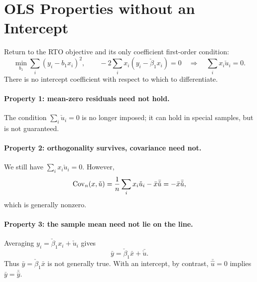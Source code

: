 \section{OLS Properties without an Intercept}
\label{sec:rto-properties}
Return to the RTO objective and its only coefficient first-order condition:
\[\min_{b_1}\sum_i(y_i-b_1x_i)^2,\qquad
-2\sum_i x_i(y_i-\check\beta_1x_i)=0
\quad\Longrightarrow\quad\sum_i x_i\check u_i=0.\]
There is no intercept coefficient with respect to which to differentiate.

\paragraph{Property 1: mean-zero residuals need not hold.}
The condition $\sum_i\check u_i=0$ is no longer imposed; it can hold in special samples, but is not guaranteed.

\paragraph{Property 2: orthogonality survives, covariance need not.}
We still have $\sum_i x_i\check u_i=0$. However,
\[\operatorname{Cov}_n(x,\check u)=\frac1n\sum_i x_i\check u_i-\bar x\bar{\check u}
=-\bar x\bar{\check u},\]
which is generally nonzero. 

\paragraph{Property 3: the sample mean need not lie on the line.}
Averaging $y_i=\check\beta_1x_i+\check u_i$ gives
\[\bar y=\check\beta_1\bar x+\bar{\check u}.\]
Thus $\bar y=\check\beta_1\bar x$ is not generally true. With an intercept, by contrast, $\bar{\hat u}=0$ implies $\bar y=\bar{\hat y}$.

